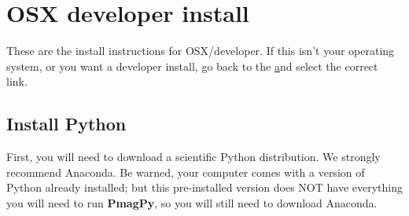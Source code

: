 \documentclass[11pt]{article}
\begin{document}
\tableofcontents

\section{OSX developer install}

These are the install instructions for OSX/developer.  If this isn't your operating system, or you want a developer install, go back to the \href{https://earthref.org/PmagPy/cookbook/#next_steps%7D%7BCookbook} and select the correct link.


\subsection{Install Python}
First, you will need to download a scientific Python distribution.  We strongly recommend Anaconda.  Be warned, your computer comes with a version of Python already installed; but this pre-installed version does NOT have everything you will need to run {\bf PmagPy}, so you will still need to download Anaconda.
\end{document}
